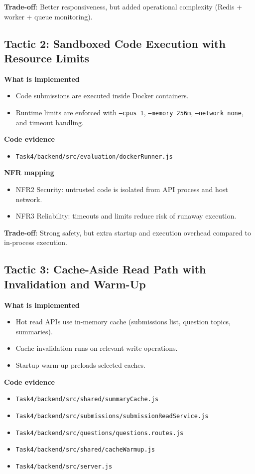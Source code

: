 \documentclass[12pt,journal,onecolumn]{IEEEtran}
\begin{document}
\textbf{Trade-off}: Better responsiveness, but added operational complexity (Redis + worker + queue monitoring).

\subsection{Tactic 2: Sandboxed Code Execution with Resource Limits}

\textbf{What is implemented}
\begin{itemize}
    \item Code submissions are executed inside Docker containers.
    \item Runtime limits are enforced with \texttt{--cpus 1}, \texttt{--memory 256m}, \texttt{--network none}, and timeout handling.
\end{itemize}

\textbf{Code evidence}
\begin{itemize}
    \item \texttt{Task4/backend/src/evaluation/dockerRunner.js}
\end{itemize}

\textbf{NFR mapping}
\begin{itemize}
    \item NFR2 Security: untrusted code is isolated from API process and host network.
    \item NFR3 Reliability: timeouts and limits reduce risk of runaway execution.
\end{itemize}

\textbf{Trade-off}: Strong safety, but extra startup and execution overhead compared to in-process execution.

\subsection{Tactic 3: Cache-Aside Read Path with Invalidation and Warm-Up}

\textbf{What is implemented}
\begin{itemize}
    \item Hot read APIs use in-memory cache (submissions list, question topics, summaries).
    \item Cache invalidation runs on relevant write operations.
    \item Startup warm-up preloads selected caches.
\end{itemize}

\textbf{Code evidence}
\begin{itemize}
    \item \texttt{Task4/backend/src/shared/summaryCache.js}
    \item \texttt{Task4/backend/src/submissions/submissionReadService.js}
    \item \texttt{Task4/backend/src/questions/questions.routes.js}
    \item \texttt{Task4/backend/src/shared/cacheWarmup.js}
    \item \texttt{Task4/backend/src/server.js}
\end{itemize}
\end{document}

